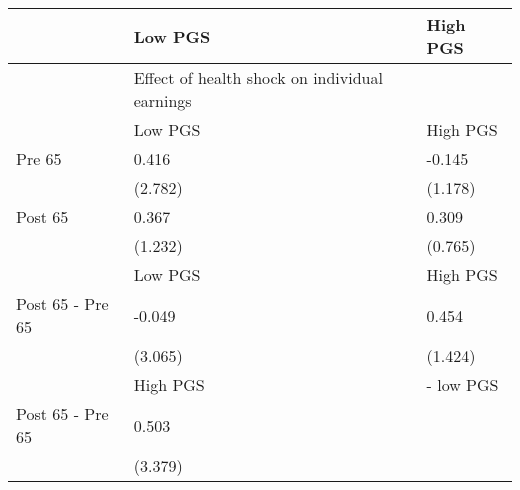 % 
\begin{tabular}{lll}
  \hline
 & Low PGS & High PGS \\ 
  \hline
 & Effect of health shock on individual earnings &  \\ 
   & Low PGS & High PGS \\ 
  Pre 65 & 0.416 & -0.145 \\ 
   & (2.782) & (1.178) \\ 
  Post 65 & 0.367 & 0.309 \\ 
   & (1.232) & (0.765) \\ 
   & Low PGS & High PGS \\ 
  Post 65 - Pre 65 & -0.049 & 0.454 \\ 
   & (3.065) & (1.424) \\ 
   & High PGS  & - low PGS \\ 
  Post 65 - Pre 65 & 0.503 &  \\ 
   & (3.379) &  \\ 
   \hline
\end{tabular}
